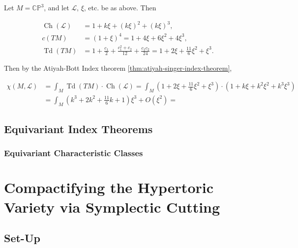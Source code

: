 \documentclass[11pt]{amsart}
\newcommand{\lbracket}{\left(}
\newcommand{\rbracket}{\right)}
\newcommand{\PP}{\mathbb{P}}
\newcommand{\CC}{\mathbb{C}}
\newcommand{\mcL}{\mathcal{L}}
\DeclareMathOperator{\Td}{Td}
\DeclareMathOperator{\Ch}{Ch}
\begin{document}
Let $M = \CC\PP^{3}$, and let $\mcL$, $\xi$, etc. be as above. Then

\begin{equation*}
	\begin{split}
		\Ch(\mcL) &= 1 + k\xi + (k\xi)^{2} + (k\xi)^{3}, \\
		c(TM) &= (1 + \xi)^{4} = 1 + 4\xi + 6\xi^{2} + 4\xi^{3}, \\
		\Td(TM) &= 1 + \frac{c_{1}}{2} + \frac{c_{1}^{2} + c_{2}}{12} + \frac{c_{1}c_{2}}{24} = 1 + 2\xi + \frac{11}{6}\xi^{2} + \xi^{3}.
	\end{split}
\end{equation*}

Then by the Atiyah-Bott Index theorem \ref{thm:atiyah-singer-index-theorem},

\begin{equation*}
	\begin{split}
		\chi(M, \mcL) &= \int_{M} \Td(TM) \cdot \Ch(\mcL) = \int_{M} \lbracket 1 + 2\xi + \frac{11}{6}\xi^{2} + \xi^{3} \rbracket \cdot \lbracket 1 + k\xi + k^{2}\xi^{2} + k^{3}\xi^{3} \rbracket \\
		&= \int_{M} \lbracket k^{3} + 2k^{2} + \frac{11}{6}k + 1 \rbracket\xi^{3} + O(\xi^{2}) = 
	\end{split}
\end{equation*}

\subsection{Equivariant Index Theorems}

\subsubsection{Equivariant Characteristic Classes}


\section{Compactifying the Hypertoric Variety via Symplectic Cutting}

\subsection{Set-Up}
\end{document}
